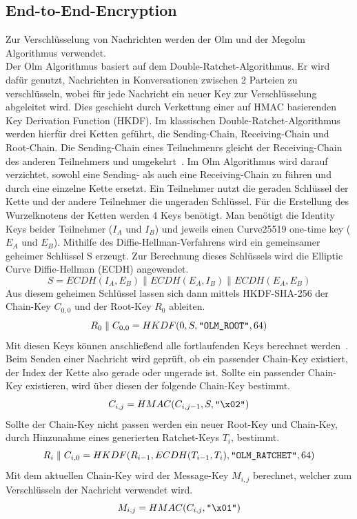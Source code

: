     \subsection{End-to-End-Encryption}\label{subsec:verwendete-schlussel}
    Zur Verschlüsselung von Nachrichten werden der Olm und der Megolm Algorithmus verwendet.\\
    Der Olm Algorithmus basiert auf dem Double-Ratchet-Algorithmus.
    Er wird dafür genutzt, Nachrichten in Konversationen zwischen 2 Parteien zu verschlüsseln, wobei für jede Nachricht ein neuer Key zur Verschlüsselung abgeleitet wird.
    Dies geschieht durch Verkettung einer auf HMAC basierenden Key Derivation Function (HKDF).
    Im klassischen Double-Ratchet-Algorithmus werden hierfür drei Ketten geführt, die Sending-Chain, Receiving-Chain und Root-Chain.
    Die Sending-Chain eines Teilnehmenrs gleicht der Receiving-Chain des anderen Teilnehmers und umgekehrt~\cite{perrin2016double}.
    Im Olm Algorithmus wird darauf verzichtet, sowohl eine Sending- als auch eine Receiving-Chain zu führen und durch eine einzelne Kette ersetzt.
    Ein Teilnehmer nutzt die geraden Schlüssel der Kette und der andere Teilnehmer die ungeraden Schlüssel.
    Für die Erstellung des Wurzelknotens der Ketten werden 4 Keys benötigt.
    Man benötigt die Identity Keys beider Teilnehmer ($I_A$ und $I_B$) und jeweils einen Curve25519 one-time key ($E_A$ und $E_B$).
    Mithilfe des Diffie-Hellman-Verfahrens wird ein gemeinsamer geheimer Schlüssel S erzeugt.
    Zur Berechnung dieses Schlüssels wird die Elliptic Curve Diffie-Hellman (ECDH) angewendet.
    \begin{displaymath}
        S = ECDH(I_A,E_B)\parallel ECDH(E_A,I_B) \parallel ECDH(E_A,E_B)
    \end{displaymath}
    Aus diesem geheimen Schlüssel lassen sich dann mittels HKDF-SHA-256 der Chain-Key $C_{0,0}$ und der Root-Key $R_0$ ableiten.
    \begin{displaymath}
        R_0 \parallel C_{0,0} = HKDF(0,S,\verb+"OLM_ROOT"+,64)
    \end{displaymath}
    Mit diesen Keys können anschließend alle fortlaufenden Keys berechnet werden~\cite{olm}.
    Beim Senden einer Nachricht wird geprüft, ob ein passender Chain-Key existiert, der Index der Kette also gerade oder ungerade ist.
    Sollte ein passender Chain-Key existieren, wird über diesen der folgende Chain-Key bestimmt.
    \begin{displaymath}
        C_{i,j} = HMAC(C_{i,j-1},S,\verb+"\x02"+)
    \end{displaymath}
    Sollte der Chain-Key nicht passen werden ein neuer Root-Key und Chain-Key, durch Hinzunahme eines generierten Ratchet-Keys $T_i$, bestimmt.
    \begin{displaymath}
        R_i \parallel C_{i,0} = HKDF(R_{i-1},ECDH(T_{i-1},T_i),\verb+"OLM_RATCHET"+,64)
    \end{displaymath}
    Mit dem aktuellen Chain-Key wird der Message-Key $M_{i,j}$ berechnet, welcher zum Verschlüsseln der Nachricht verwendet wird.
    \begin{displaymath}
       M_{i,j} = HMAC(C_{i,j},\verb+"\x01"+)
    \end{displaymath}

